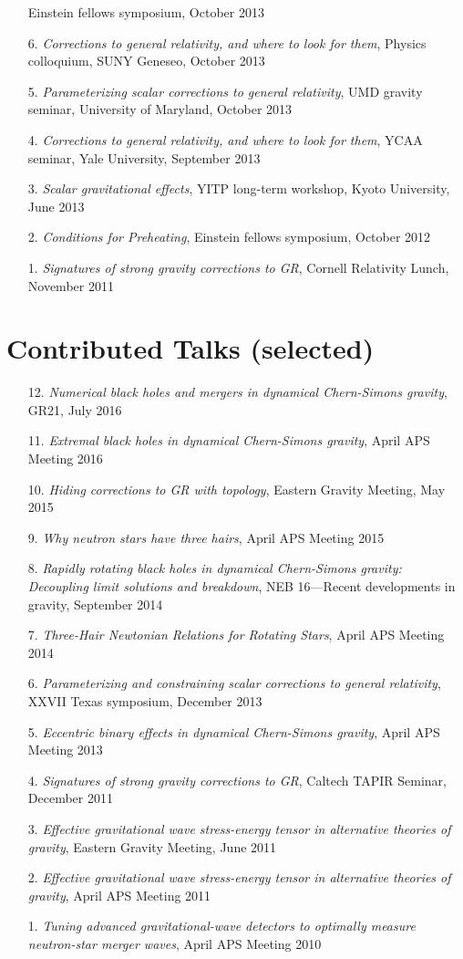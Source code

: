 \begin{enumerate}
  Einstein fellows symposium, October 2013
\item[{6.}] {\it Corrections to general relativity, and where to look for them},
  Physics colloquium, SUNY Geneseo, October 2013
\item[{5.}] {\it Parameterizing scalar corrections to general relativity}, UMD gravity seminar,
 University of Maryland, October 2013
\item[{4.}] {\it Corrections to general relativity, and where to look for them},
  YCAA seminar, Yale University, September 2013
\item[{3.}] {\it Scalar gravitational effects}, YITP long-term
  workshop, Kyoto University, June 2013
\item[{2.}] {\it Conditions for Preheating},
  Einstein fellows symposium, October 2012
\item[{1.}] {\it Signatures of strong gravity corrections to GR},
  Cornell Relativity Lunch, November 2011
\end{enumerate}

\section{\sc Contributed Talks (selected)}
\begin{enumerate}
\item[{12.}] {\it Numerical black holes and mergers in dynamical
    Chern-Simons gravity},
  GR21, July 2016
\item[{11.}] {\it Extremal black holes in dynamical Chern-Simons gravity},
 April APS Meeting 2016
\item[{10.}] {\it Hiding corrections to GR with topology},
 Eastern Gravity Meeting, May 2015
\item[{9.}] {\it Why neutron stars have three hairs},
 April APS Meeting 2015
\item[{8.}] {\it Rapidly rotating black holes in dynamical Chern-Simons gravity:
    Decoupling limit solutions and breakdown},
 NEB 16---Recent developments in gravity, September 2014
\item[{7.}] {\it Three-Hair Newtonian Relations for Rotating Stars},
 April APS Meeting 2014
\item[{6.}] {\it Parameterizing and constraining scalar corrections to general relativity},
 XXVII Texas symposium, December 2013
\item[{5.}] {\it Eccentric binary effects in dynamical Chern-Simons gravity},
  April APS Meeting 2013
\item[{4.}] {\it Signatures of strong gravity corrections to GR},
  Caltech TAPIR Seminar, December 2011
\item[{3.}] {\it Effective gravitational wave stress-energy tensor in
    alternative theories of gravity}, Eastern Gravity Meeting, June 2011
\item[{2.}] {\it Effective gravitational wave stress-energy tensor in alternative theories of gravity}, April APS Meeting 2011
\item[{1.}] {\it Tuning advanced gravitational-wave detectors to
    optimally measure neutron-star merger waves}, April APS Meeting 2010
\end{enumerate}


